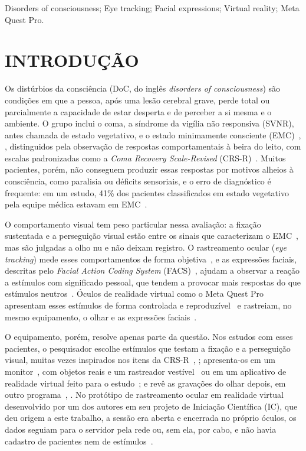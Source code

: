 \documentclass[conference,a4paper,10pt]{IEEEtran}
\begin{document}
\begin{keywords}
Disorders of consciousness; Eye tracking; Facial expressions; Virtual reality; Meta Quest Pro.
\end{keywords}



\section{INTRODUÇÃO}

Os distúrbios da consciência (DoC, do inglês \textit{disorders of consciousness}) são condições em que a pessoa, após uma lesão cerebral grave, perde total ou parcialmente a capacidade de estar desperta e de perceber a si mesma e o ambiente. O grupo inclui o coma, a síndrome da vigília não responsiva (SVNR), antes chamada de estado vegetativo, e o estado minimamente consciente (EMC)~\cite{LAUREYS}, \cite{GIACINO2002}, distinguidos pela observação de respostas comportamentais à beira do leito, com escalas padronizadas como a \textit{Coma Recovery Scale-Revised} (CRS-R)~\cite{GIACINO2004}. Muitos pacientes, porém, não conseguem produzir essas respostas por motivos alheios à consciência, como paralisia ou déficits sensoriais, e o erro de diagnóstico é frequente: em um estudo, 41\% dos pacientes classificados em estado vegetativo pela equipe médica estavam em EMC~\cite{SCHNAKERS}.

O comportamento visual tem peso particular nessa avaliação: a fixação sustentada e a perseguição visual estão entre os sinais que caracterizam o EMC~\cite{GIACINO2002}, mas são julgadas a olho nu e não deixam registro. O rastreamento ocular (\textit{eye tracking}) mede esses comportamentos de forma objetiva~\cite{TROJANO}, e as expressões faciais, descritas pelo \textit{Facial Action Coding System} (FACS)~\cite{EKMAN}, ajudam a observar a reação a estímulos com significado pessoal, que tendem a provocar mais respostas do que estímulos neutros~\cite{MAGLIACANO}. Óculos de realidade virtual como o Meta Quest Pro apresentam esses estímulos de forma controlada e reproduzível~\cite{CLAY} e rastreiam, no mesmo equipamento, o olhar e as expressões faciais~\cite{META-MOVE}.

O equipamento, porém, resolve apenas parte da questão. Nos estudos com esses pacientes, o pesquisador escolhe estímulos que testam a fixação e a perseguição visual, muitas vezes inspirados nos itens da CRS-R~\cite{JOHANSSON}, \cite{HYUN}; apresenta-os em um monitor~\cite{TROJANO}, com objetos reais e um rastreador vestível~\cite{JOHANSSON} ou em um aplicativo de realidade virtual feito para o estudo~\cite{HYUN}; e revê as gravações do olhar depois, em outro programa~\cite{TROJANO}, \cite{JOHANSSON}. No protótipo de rastreamento ocular em realidade virtual desenvolvido por um dos autores em seu projeto de Iniciação Científica (IC), que deu origem a este trabalho, a sessão era aberta e encerrada no próprio óculos, os dados seguiam para o servidor pela rede ou, sem ela, por cabo, e não havia cadastro de pacientes nem de estímulos~\cite{IC}.
\end{document}
